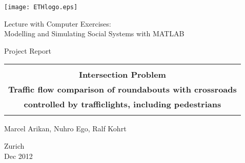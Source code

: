 
\thispagestyle{empty}

\begin{center}
\texttt{[image: ETHlogo.eps]}

\bigskip


\bigskip


\bigskip


\LARGE{ 	Lecture with Computer Exercises:\\ }
\LARGE{ Modelling and Simulating Social Systems with MATLAB\\}

\bigskip

\bigskip

\small{Project Report}\\

\bigskip

\bigskip

\bigskip

\bigskip


\begin{tabular}{|c|}
\hline
\\
\textbf{\LARGE{Intersection Problem}}\\
\textbf{\LARGE{Traffic flow comparison of roundabouts with crossroads}}\\
\textbf{\LARGE{controlled by trafficlights, including pedestrians}}\\
\\
\hline
\end{tabular}
\bigskip

\bigskip

\bigskip

\LARGE{Marcel Arikan, Nuhro Ego, Ralf Kohrt}



\bigskip

\bigskip

\bigskip

\bigskip

\bigskip

\bigskip

\bigskip

\bigskip

Zurich\\
Dec 2012\\

\end{center}


